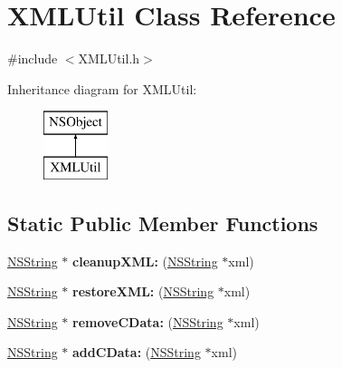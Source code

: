 \hypertarget{interface_x_m_l_util}{
\section{\-X\-M\-L\-Util \-Class \-Reference}
\label{interface_x_m_l_util}
}


{\ttfamily \#include $<$\-X\-M\-L\-Util.\-h$>$}

\-Inheritance diagram for \-X\-M\-L\-Util\-:\begin{figure}[H]
\begin{center}
\leavevmode
\includegraphics[height=2.000000cm]{interface_x_m_l_util}
\end{center}
\end{figure}
\subsection*{\-Static \-Public \-Member \-Functions}
\begin{DoxyCompactItemize}
\item 
\hypertarget{interface_x_m_l_util_a88dba1812e5f0ce546400e0ecdd4670d}{
\hyperlink{class_n_s_string}{\-N\-S\-String} $\ast$ {\bfseries cleanup\-X\-M\-L\-:} (\hyperlink{class_n_s_string}{\-N\-S\-String} $\ast$xml)}
\label{interface_x_m_l_util_a88dba1812e5f0ce546400e0ecdd4670d}

\item 
\hypertarget{interface_x_m_l_util_ab7f4f06f02888af2281b9b98a8b103af}{
\hyperlink{class_n_s_string}{\-N\-S\-String} $\ast$ {\bfseries restore\-X\-M\-L\-:} (\hyperlink{class_n_s_string}{\-N\-S\-String} $\ast$xml)}
\label{interface_x_m_l_util_ab7f4f06f02888af2281b9b98a8b103af}

\item 
\hypertarget{interface_x_m_l_util_a86ae34669772064d33cefdb5131a9e3f}{
\hyperlink{class_n_s_string}{\-N\-S\-String} $\ast$ {\bfseries remove\-C\-Data\-:} (\hyperlink{class_n_s_string}{\-N\-S\-String} $\ast$xml)}
\label{interface_x_m_l_util_a86ae34669772064d33cefdb5131a9e3f}

\item 
\hypertarget{interface_x_m_l_util_a18840ad3c92adedaf6cb9c9741c866ff}{
\hyperlink{class_n_s_string}{\-N\-S\-String} $\ast$ {\bfseries add\-C\-Data\-:} (\hyperlink{class_n_s_string}{\-N\-S\-String} $\ast$xml)}
\label{interface_x_m_l_util_a18840ad3c92adedaf6cb9c9741c866ff}

\end{DoxyCompactItemize}


